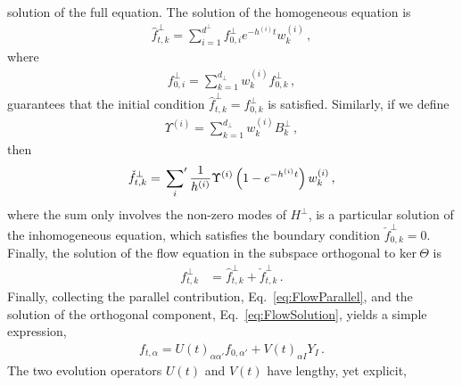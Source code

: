 solution of the full equation. The solution of the homogeneous equation is
\begin{align}
    \label{eq:HomoSoln}
    \hat{f}^{\perp}_{t,k} = \sum_{i=1}^{d^\perp} f^{\perp}_{0,i} e^{-h^{(i)}t} w^{(i)}_k\, ,
\end{align}
where
\begin{align}
    \label{eq:InitialCi}
    f^{\perp}_{0,i} = \sum_{k=1}^{d_\perp} w^{(i)}_k f^\perp_{0,k}\, ,
\end{align}
guarantees that the initial condition $\hat{f}^\perp_{t,k}=f^\perp_{0,k}$ is
satisfied. Similarly, if we define
\begin{align}
    \label{eq:BiDef}
    \Upsilon^{(i)} = \sum_{k=1}^{d_\perp} w^{(i)}_k B^\perp_{k}\, ,
\end{align}
then
\begin{align}
    \label{eq:PartSol}
    \check{f}^\perp_{t,k} = \sideset{}{'}\sum_{i} \frac{1}{h^{(i)}} \Upsilon^{(i)}
        \left(1 - e^{-h^{(i)}t}\right) w^{(i)}_k\, ,
\end{align}
where the sum only involves the non-zero modes of $H^\perp$, is a particular
solution of the inhomogeneous equation, which satisfies the boundary condition
$\check{f}^{\perp}_{0,k}=0$. Finally, the solution of the flow equation in the
subspace orthogonal to $\text{ker}\ \Theta$ is
\begin{align}
    f^\perp_{t,k}
    \label{eq:FlowSolution}
        &= \hat{f}^\perp_{t,k} + \check{f}^\perp_{t,k}
        \, .
\end{align}
Finally, collecting the parallel contribution, Eq.~\eqref{eq:FlowParallel}, and
the solution of the orthogonal component, Eq.~\eqref{eq:FlowSolution}, yields a
simple expression,
\begin{align}
    \label{eq:AnalyticSol}
    f_{t,\alpha}
        = U(t)_{\alpha\alpha'} f_{0,\alpha'} + V(t)_{\alpha I} Y_{I}\, .
\end{align}
The two evolution operators $U(t)$ and $V(t)$ have lengthy, yet explicit,
